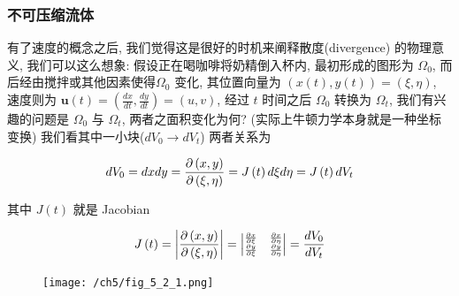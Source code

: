 \documentclass[aspectratio=2516]{beamer}
\begin{document}

\begin{frame}
\frametitle{\kaishu 不可压缩流体}

\kaishu 

\small

有了速度的概念之后, 我们觉得这是很好的时机来阐释散度(divergence) 的物理意义, 我们可以这么想象: 假设正在喝咖啡将奶精倒入杯内, 最初形成的图形为 $ \Omega_{0} $, 而后经由搅拌或其他因素使得$ \Omega_{0} $ 变化, 其位置向量为 $\left( {x\left( t \right),y\left( t \right)} \right) = \left( {\xi ,\eta } \right)$, 速度则为 $ \boldsymbol{u}\left(t\right)  = \left( {\frac{{dx}}{{dt}},\frac{{dy}}{{dt}}} \right) = \left( {u,v} \right)$, 经过 $ t $ 时间之后 $ \Omega_{0} $ 转换为 $ \Omega_{t} $, 我们有兴趣的问题是 $ \Omega_{0} $ 与 $ \Omega_{t} $, 两者之面积变化为何? (实际上牛顿力学本身就是一种坐标变换) 我们看其中一小块($d{V_0} \to d{V_t}$) 两者关系为

\begin{equation}
\tiny 
d{V_0} = dxdy = \frac{{\partial \left( {x,y} \right)}}{{\partial \left( {\xi ,\eta } \right)}} = J\left( t \right)d\xi d\eta  = J\left( t \right)d{V_t}
\label{eq5.2.1}
\end{equation}

其中 $J\left( t \right)$ 就是 Jacobian

\begin{equation}
\tiny 
J\left( t \right) = \left| {\frac{{\partial \left( {x,y} \right)}}{{\partial \left( {\xi ,\eta } \right)}}} \right| = \left| {\begin{matrix}
	{\frac{{\partial x}}{{\partial \xi }}} & {\frac{{\partial x}}{{\partial \eta }}}  \\ 
	{\frac{{\partial y}}{{\partial \xi }}} & {\frac{{\partial y}}{{\partial \eta }}}  \\ 
	\end{matrix} } \right| = \frac{{d{V_0}}}{{d{V_t}}}
\label{eq5.2.2}
\end{equation}

\begin{figure}[!htb]
	\centering
	\texttt{[image: /ch5/fig\_5\_2\_1.png]}
	\label{img001}
\end{figure}

\end{frame}

\end{document}
